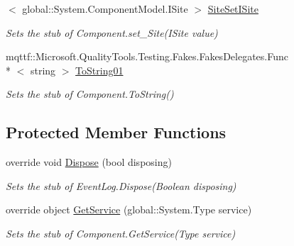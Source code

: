 \begin{DoxyCompactItemize}
$<$ global\-::\-System.\-Component\-Model.\-I\-Site $>$ \hyperlink{class_system_1_1_diagnostics_1_1_fakes_1_1_stub_event_log_a70943090351cd470ce18f53e92b37465}{Site\-Set\-I\-Site}
\begin{DoxyCompactList}\small\item\em Sets the stub of Component.\-set\-\_\-\-Site(\-I\-Site value)\end{DoxyCompactList}\item 
mqttf\-::\-Microsoft.\-Quality\-Tools.\-Testing.\-Fakes.\-Fakes\-Delegates.\-Func\\*
$<$ string $>$ \hyperlink{class_system_1_1_diagnostics_1_1_fakes_1_1_stub_event_log_ae55cbb43de614a6f392a0230d09d6e48}{To\-String01}
\begin{DoxyCompactList}\small\item\em Sets the stub of Component.\-To\-String()\end{DoxyCompactList}\end{DoxyCompactItemize}
\subsection*{Protected Member Functions}
\begin{DoxyCompactItemize}
\item 
override void \hyperlink{class_system_1_1_diagnostics_1_1_fakes_1_1_stub_event_log_ac269f5b3a56f70ee2a7a635c032540be}{Dispose} (bool disposing)
\begin{DoxyCompactList}\small\item\em Sets the stub of Event\-Log.\-Dispose(\-Boolean disposing)\end{DoxyCompactList}\item 
override object \hyperlink{class_system_1_1_diagnostics_1_1_fakes_1_1_stub_event_log_a00e152287e4edb11bcd3832881015a90}{Get\-Service} (global\-::\-System.\-Type service)
\begin{DoxyCompactList}\small\item\em Sets the stub of Component.\-Get\-Service(\-Type service)\end{DoxyCompactList}\end{DoxyCompactItemize}
